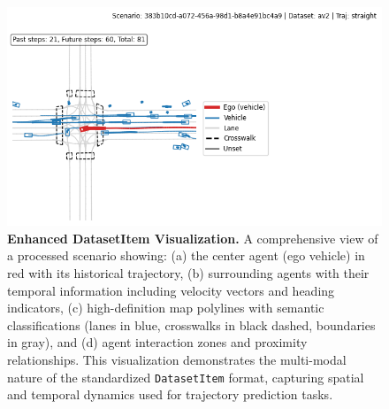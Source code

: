 \begin{figure}[htbp]
    \centering
    \includegraphics[width=\textwidth]{figures/plot_datasetitem.png}
    \caption{
        \textbf{Enhanced DatasetItem Visualization.} A comprehensive view of a processed scenario showing: (a) the center agent (ego vehicle) in red with its historical trajectory, (b) surrounding agents with their temporal information including velocity vectors and heading indicators, (c) high-definition map polylines with semantic classifications (lanes in blue, crosswalks in black dashed, boundaries in gray), and (d) agent interaction zones and proximity relationships. This visualization demonstrates the multi-modal nature of the standardized \texttt{DatasetItem} format, capturing spatial and temporal dynamics used for trajectory prediction tasks.
    }
    \label{fig:datasetitem_visualization}
\end{figure}

\newpage